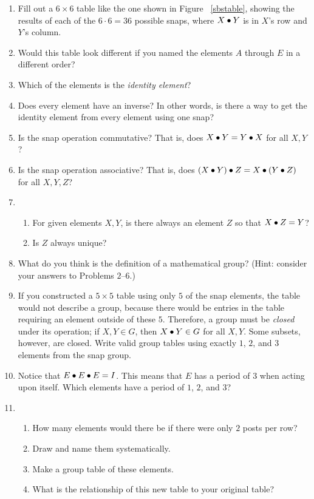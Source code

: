 \documentclass[../gatm.tex]{subfiles}
\begin{document}
\begin{enumerate}
\item Fill out a $6\times 6$ table like the one shown in Figure ~\ref{sbstable}, showing the results of each of the $6\cdot 6 = 36$ possible snaps, where $X\bullet Y$ is in $X$'s row and $Y$'s column.
\item Would this table look different if you named the elements $A$ through $E$ in a different order?
\item Which of the elements is the \textit{identity element}?
\item Does every element have an inverse? In other words, is there a way to get the identity element from every element using one snap?
\item Is the snap operation commutative? That is, does $X \bullet Y = Y \bullet X$ for all $X,Y$?
\item Is the snap operation associative? That is, does $(X \bullet Y) \bullet Z = X \bullet (Y\bullet Z)$ for all $X,Y,Z$?
\item \begin{enumerate}
\item For given elements $X, Y$, is there always an element $Z$ so that $X\bullet Z=Y$?
\item Is $Z$ always unique?
\end{enumerate}
\item What do you think is the definition of a mathematical group? (Hint: consider your answers to Problems $2$--$6$.)
\item If you constructed a $5\times 5$ table using only $5$ of the snap elements, the table would not describe a group, because there would be entries in the table requiring an element outside of these $5$. Therefore, a group must be \textit{closed} under its operation; if $X,Y\in G$, then $X\bullet Y\in G$ for all $X,Y$. Some subsets, however, are closed. Write valid group tables using exactly $1$, $2$, and $3$ elements from the snap group.
\item Notice that $E\bullet E\bullet E=I$. This means that $E$ has a period of $3$ when acting upon itself. Which elements have a period of $1$, $2$, and $3$?
\item \begin{enumerate}
\item How many elements would there be if there were only $2$ posts per row?
\item Draw and name them systematically.
\item Make a group table of these elements.
\item What is the relationship of this new table to your original table?

\end{enumerate}
\end{enumerate}
\end{document}
